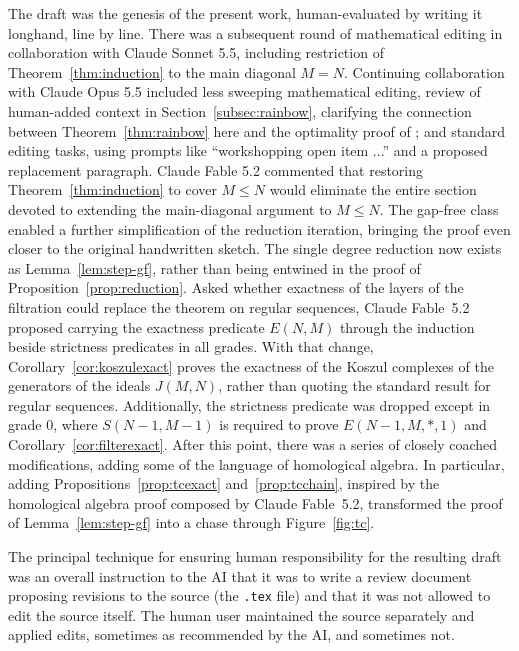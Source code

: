 \documentclass[12pt]{amsart}
\theoremstyle{definition}
\theoremstyle{remark}
\newcommand\KSV{monthly-kutin-smithline-vatter}
\begin{document}
The draft \cite{claude-sonnet-2026-koszul} was the genesis of the present work,
human-evaluated by writing it longhand, line by line.  There was a subsequent round of
mathematical editing in collaboration with Claude Sonnet 5.5,
including restriction of Theorem~\ref{thm:induction} to the main diagonal $M = N$.
Continuing collaboration with Claude Opus 5.5
included less sweeping mathematical editing,
review of human-added context in Section~\ref{subsec:rainbow},
clarifying the connection between Theorem~\ref{thm:rainbow} here
and the optimality proof of \cite{\KSV}; and standard editing tasks, using
prompts like ``workshopping open item ...'' and a proposed replacement paragraph.
 Claude Fable 5.2 commented that restoring
 Theorem~\ref{thm:induction} to cover $M \leq N$ would eliminate the entire section
 devoted to extending the main-diagonal argument to $M \leq N$. 
 The gap-free class enabled a further
 simplification of the reduction iteration, bringing the proof even closer
 to the original handwritten sketch.  The single degree reduction now exists as
 Lemma~\ref{lem:step-gf}, rather than being entwined in the proof of Proposition~\ref{prop:reduction}.
 Asked whether exactness of the layers of the filtration could replace the
 theorem on regular sequences, Claude Fable~5.2 proposed carrying the exactness
 predicate $E(N, M)$ through the induction beside strictness predicates in all grades.
 With that change, Corollary~\ref{cor:koszulexact} proves the exactness of the Koszul complexes of
 the generators of the ideals $J(M, N)$, rather than quoting the standard result
 for regular sequences.  Additionally, the strictness predicate was dropped except
 in grade 0, where $S(N-1, M-1)$ is required to prove $E(N-1, M, *, 1)$ and Corollary~\ref{cor:filterexact}.
 After this point,
 there was a series of closely coached modifications, adding some of the
 language of homological algebra.  In particular, adding Propositions~\ref{prop:tcexact}  and~\ref{prop:tcchain},
 inspired by the homological algebra proof composed by Claude Fable~5.2,
 transformed the proof of Lemma~\ref{lem:step-gf}
 into a chase through Figure~\ref{fig:tc}.
 
 
The principal technique for ensuring human responsibility for the resulting draft
was an overall instruction to the AI that it was to write a review document proposing
revisions to the source (the \texttt{.tex} file)
and that it was not allowed to edit the source itself.
The human user maintained the source separately and applied edits, sometimes
as recommended by the AI, and sometimes not.  
\end{document}
